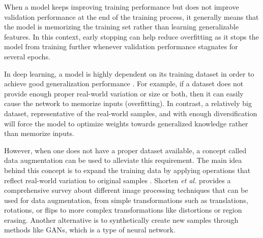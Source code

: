     When a model keeps improving training performance but does not improve validation performance at the end of the training process, it generally means that the model is memorizing the training set rather than learning generalizable features. In this context, early stopping can help reduce overfitting as it stops the model from training further whenever validation performance stagnates for several epochs. \par
    
    In deep learning, a model is highly dependent on its training dataset in order to achieve good generalization performance \cite{Shorten2019}. For example, if a dataset does not provide enough proper real-world variation or size or both, then it can easily cause the network to memorize inputs (overfitting). In contrast, a relatively big dataset, representative of the real-world samples, and with enough diversification will force the model to optimize weights towards generalized knowledge rather than memorize inputs. \par
    
    However, when one does not have a proper dataset available, a concept called data augmentation can be used to alleviate this requirement. The main idea behind this concept is to expand the training data by applying operations that reflect real-world variation to original samples \cite{Nielsen2017a}. Shorten \textit{et al.} \cite{Shorten2019} provides a comprehensive survey about different image processing techniques that can be used for data augmentation, from simple transformations such as translations, rotations, or flips to more complex transformations like distortions or region erasing. Another alternative is to synthetically create new samples through methods like \ac{GAN}s, which is a type of neural network. \par 
    
